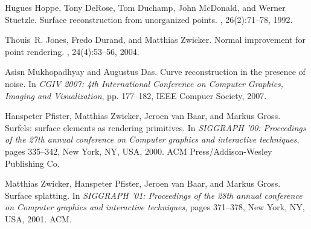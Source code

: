 \documentclass{article}
\numberwithin{cntr}{section}
\numberwithin{equation}{section}
\begin{document}
\begin{thebibliography}{99}
Hugues Hoppe, Tony DeRose, Tom Duchamp, John McDonald, and Werner Stuetzle.
\newblock Surface reconstruction from unorganized points.
, 26(2):71--78, 1992.

Thouis~R. Jones, Fredo Durand, and Matthias Zwicker.
\newblock Normal improvement for point rendering.
, 24(4):53--56, 2004.

Asisn Mukhopadhyay and Augustus Das.
\newblock Curve reconstruction in the presence of noise.
\newblock In {\em CGIV 2007: 4th International Conference on
Computer Graphics, Imaging and Visualization}, pp. 177--182,
IEEE Compuer Society, 2007.

Hanspeter Pfister, Matthias Zwicker, Jeroen van Baar, and Markus Gross.
\newblock Surfels: surface elements as rendering primitives.
\newblock In {\em SIGGRAPH '00: Proceedings of the 27th annual conference on
  Computer graphics and interactive techniques}, pages 335--342, New York, NY,
  USA, 2000. ACM Press/Addison-Wesley Publishing Co.

Matthias Zwicker, Hanspeter Pfister, Jeroen van Baar, and Markus Gross.
\newblock Surface splatting.
\newblock In {\em SIGGRAPH '01: Proceedings of the 28th annual conference on
  Computer graphics and interactive techniques}, pages 371--378, New York, NY,
  USA, 2001. ACM.

\end{thebibliography}
\end{document}
